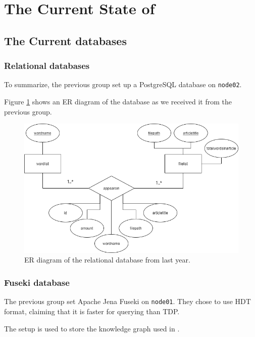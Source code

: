 \section{The Current State of \knox{}} \label{currentState}




\subsection{The Current \knox{} databases}
\subsubsection*{Relational databases}
To summarize, the previous group set up a PostgreSQL database on \texttt{node02}.

Figure \ref{olddatabase} shows an ER diagram of the database as we received it from the previous group.

\begin{figure}[h]
    \centering
    \includegraphics[width=\linewidth]{Images/old_db_er_diagram.png}
    \caption{ER diagram of the relational database from last year.}
    \label{olddatabase}
\end{figure}

\subsubsection*{Fuseki database}
The previous group set Apache Jena Fuseki on \texttt{node01}. They chose to use HDT format, claiming that it is faster for querying than TDP\cite{knox2020}.

The setup is used to store the knowledge graph used in \knox{}.

